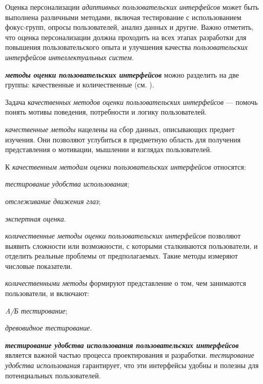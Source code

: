 \begin{textitemize}
	Оценка персонализации \textit{адаптивных пользовательских интерфейсов} может быть выполнена различными методами, включая тестирование с использованием фокус-групп, опросы пользователей, анализ данных и другие. Важно отметить, что оценка персонализации должна проходить на всех этапах разработки для повышения пользовательского опыта и улучшения качества \textit{пользовательских интерфейсов интеллектуальных систем}.
\end{textitemize}


\textbf{\textit{методы оценки пользовательских интерфейсов}} можно разделить на две группы: качественные и количественные (см. ).
	
Задача \textit{качественных методов оценки пользовательских интерфейсов} --- помочь понять мотивы поведения, потребности и логику пользователей.
	
\textit{качественные методы} нацелены на сбор данных, описывающих предмет изучения. Они позволяют углубиться в предметную область для получения представления о мотивации, мышлении и взглядах пользователей. 
	
К \textit{качественным методам оценки пользовательских интерфейсов} относятся:
\begin{textitemize}
	\item \textit{тестирование удобства использования};
	\item \textit{отслеживание движения глаз};
	\item \textit{экспертная оценка}.
\end{textitemize}	

\textit{количественные методы оценки пользовательских интерфейсов} позволяют выявить сложности или возможности, с которыми сталкиваются пользователи, и отделить реальные проблемы от предполагаемых. Такие методы измеряют числовые показатели. 

\textit{количественными методы} формируют представление о том, чем занимаются пользователи, и включают:
\begin{textitemize}
	\item \textit{A/Б тестирование};
	\item \textit{древовидное тестирование}.
\end{textitemize}	


\textbf{\textit{тестирование удобства использования пользовательских интерфейсов}} является важной частью процесса проектирования и разработки. \textit{тестирование удобства использования} гарантирует, что эти интерфейсы удобны и полезны для потенциальных пользователей.

